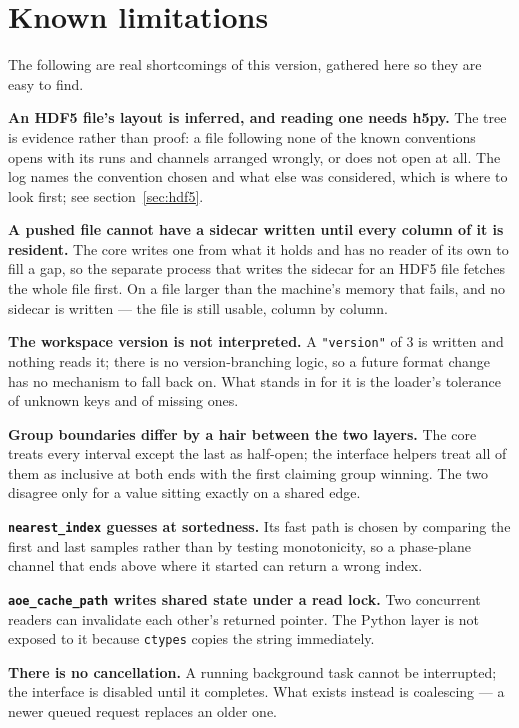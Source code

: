 \documentclass[11pt,a4paper,oneside]{report}
\newcommand{\code}[1]{\texttt{#1}}
\begin{document}
\chapter{Known limitations}

The following are real shortcomings of this version, gathered here so they are
easy to find.

\textbf{An HDF5 file's layout is inferred, and reading one needs h5py.} The
tree is evidence rather than proof: a file following none of the known
conventions opens with its runs and channels arranged wrongly, or does not open
at all. The log names the convention chosen and what else was considered, which
is where to look first; see section~\ref{sec:hdf5}.

\textbf{A pushed file cannot have a sidecar written until every column of it is
resident.} The core writes one from what it holds and has no reader of its own
to fill a gap, so the separate process that writes the sidecar for an HDF5 file
fetches the whole file first. On a file larger than the machine's memory that
fails, and no sidecar is written --- the file is still usable, column by
column.

\textbf{The workspace version is not interpreted.} A \code{"version"} of 3 is
written and nothing reads it; there is no version-branching logic, so a future
format change has no mechanism to fall back on. What stands in for it is the
loader's tolerance of unknown keys and of missing ones.

\textbf{Group boundaries differ by a hair between the two layers.} The core
treats every interval except the last as half-open; the interface helpers treat
all of them as inclusive at both ends with the first claiming group winning. The
two disagree only for a value sitting exactly on a shared edge.

\textbf{\code{nearest\_index} guesses at sortedness.} Its fast path is chosen by
comparing the first and last samples rather than by testing monotonicity, so a
phase-plane channel that ends above where it started can return a wrong index.

\textbf{\code{aoe\_cache\_path} writes shared state under a read lock.} Two
concurrent readers can invalidate each other's returned pointer. The Python
layer is not exposed to it because \code{ctypes} copies the string immediately.

\textbf{There is no cancellation.} A running background task cannot be
interrupted; the interface is disabled until it completes. What exists instead
is coalescing --- a newer queued request replaces an older one.
\end{document}
